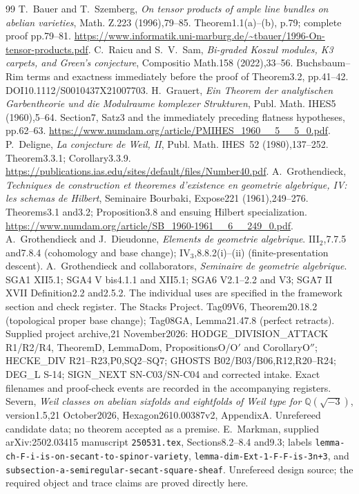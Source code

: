 \begin{thebibliography}{99}
 T.~Bauer and T.~Szemberg, \emph{On tensor products of ample line bundles on abelian varieties}, Math. Z.223 (1996),79--85. Theorem1.1(a)--(b), p.79; complete proof pp.79--81. \url{https://www.informatik.uni-marburg.de/~tbauer/1996-On-tensor-products.pdf}.
 C.~Raicu and S.~V.~Sam, \emph{Bi-graded Koszul modules, K3 carpets, and Green's conjecture}, Compositio Math.158 (2022),33--56. Buchsbaum--Rim terms and exactness immediately before the proof of Theorem3.2, pp.41--42. DOI10.1112/S0010437X21007703.
 H.~Grauert, \emph{Ein Theorem der analytischen Garbentheorie und die Modulraume komplexer Strukturen}, Publ. Math. IHES5 (1960),5--64. Section7, Satz3 and the immediately preceding flatness hypotheses, pp.62--63. \url{https://www.numdam.org/article/PMIHES_1960__5__5_0.pdf}.
 P.~Deligne, \emph{La conjecture de Weil, II}, Publ. Math. IHES~52 (1980),137--252. Theorem3.3.1; Corollary3.3.9. \url{https://publications.ias.edu/sites/default/files/Number40.pdf}.
 A.~Grothendieck, \emph{Techniques de construction et theoremes d'existence en geometrie algebrique, IV: les schemas de Hilbert}, Seminaire Bourbaki, Expose221 (1961),249--276. Theorems3.1 and3.2; Proposition3.8 and ensuing Hilbert specialization. \url{https://www.numdam.org/article/SB_1960-1961__6__249_0.pdf}.
 A.~Grothendieck and J.~Dieudonne, \emph{Elements de geometrie algebrique}. III$_2$,7.7.5 and7.8.4 (cohomology and base change); IV$_3$,8.8.2(i)--(ii) (finite-presentation descent).
 A.~Grothendieck and collaborators, \emph{Seminaire de geometrie algebrique}. SGA1 XII5.1; SGA4 V bis4.1.1 and XII5.1; SGA6 V2.1--2.2 and V3; SGA7 II XVII Definition2.2 and2.5.2. The individual uses are specified in the framework section and check register.
 The Stacks Project. Tag09V6, Theorem20.18.2 (topological proper base change); Tag08GA, Lemma21.47.8 (perfect retracts).
 Supplied project archive,21 November2026: HODGE\_DIVISION\_ATTACK R1/R2/R4, TheoremD, LemmaDom, PropositionsO/O$'$ and CorollaryO$''$; HECKE\_DIV R21--R23,P0,SQ2--SQ7; GHOSTS B02/B03/B06,R12,R20--R24; DEG\_L S-14; SIGN\_NEXT SN-C03/SN-C04 and corrected intake. Exact filenames and proof-check events are recorded in the accompanying registers.
 Severn, \emph{Weil classes on abelian sixfolds and eightfolds of Weil type for $\mathbb Q(\sqrt{-3})$}, version1.5,21 October2026, Hexagon2610.00387v2, AppendixA. Unrefereed candidate data; no theorem accepted as a premise.
 E.~Markman, supplied arXiv:2502.03415 manuscript \texttt{250531.tex}, Sections8.2--8.4 and9.3; labels \texttt{lemma-ch-F-i-is-on-secant-to-spinor-variety}, \texttt{lemma-dim-Ext-1-F-F-is-3n+3}, and \texttt{subsection-a-semiregular-secant-square-sheaf}. Unrefereed design source; the required object and trace claims are proved directly here.

\end{thebibliography}
